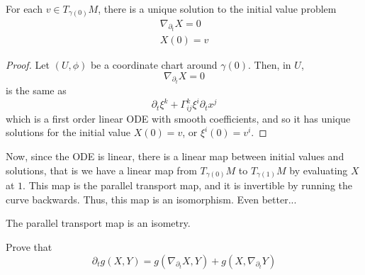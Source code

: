 \documentclass[../main.tex]{subfiles}
\begin{document}
\begin{theorem}
    For each $v\in T_{\gamma(0)}M$, there is a unique solution to the initial
    value problem
    \[
        \begin{aligned}
            \nabla_{\partial_t}X = 0\\
            X(0)=v
        \end{aligned}
    \]
\end{theorem}
\begin{proof}
    Let $(U,\phi)$ be a coordinate chart around $\gamma(0)$. Then, in $U$,
    \[
        \nabla_{\partial_t}X = 0
    \]
    is the same as
    \[
        \partial_t\xi^k + \Gamma^k_{ij}\xi^i\partial_tx^j
    \]
    which is a first order linear ODE with smooth coefficients, and so it has
    unique solutions for the initial value $X(0)=v$, or $\xi^i(0) = v^i$.
\end{proof}
Now, since the ODE is linear, there is a linear map between initial values and
solutions, that is we have a linear map from $T_{\gamma(0)}M$ to
$T_{\gamma(1)}M$ by evaluating $X$ at $1$. This map is the parallel transport
map, and it is invertible by running the curve backwards. Thus, this map is an
isomorphism. Even better...
\begin{prop}
    The parallel transport map is an isometry.
\end{prop}

\begin{hw}
Prove that
    \[
        \partial_t g(X,Y) = g(\nabla_{\partial_t}X,Y) +
        g(X,\nabla_{\partial_t}Y)
    \]
\end{hw}
\end{document}
